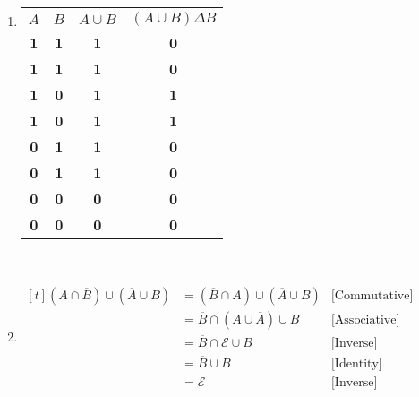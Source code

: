 \begin{enumerate}[leftmargin=2cm,labelsep=.5cm,label=\bf\arabic*.]
\item
\begin{tabu}[t]{|c|c|c|c|}
\hline
$A$ & $B$ & $A\cup B$ & $(A\cup B)\Delta B$ \\ \hline
\textbf{1} & \textbf{1} & \textbf{1} & \textbf{0} \\ \hline
\textbf{1} & \textbf{1} & \textbf{1} & \textbf{0} \\ \hline
\textbf{1} & \textbf{0} & \textbf{1} & \textbf{1} \\ \hline
\textbf{1} & \textbf{0} & \textbf{1} & \textbf{1} \\ \hline
\textbf{0} & \textbf{1} & \textbf{1} & \textbf{0} \\ \hline
\textbf{0} & \textbf{1} & \textbf{1} & \textbf{0} \\ \hline
\textbf{0} & \textbf{0} & \textbf{0} & \textbf{0} \\ \hline
\textbf{0} & \textbf{0} & \textbf{0} & \textbf{0} \\ \hline
\end{tabu}\\[5mm]

\item $
\begin{aligned}[t]
(A \cap \overline{B}) \cup (\overline{A} \cup B) &= (\overline{B} \cap A) \cup (\overline{A} \cup B) & \text{[Commutative]}\\
&= \overline{B} \cap (A \cup \overline{A}) \cup B & \text{[Associative]}\\
&= \overline{B} \cap \mathscr{E} \cup B & \text{[Inverse]}\\
&= \overline{B} \cup B & \text{[Identity]}\\
&= \mathscr{E} & \text{[Inverse]}
\end{aligned} $
\end{enumerate}